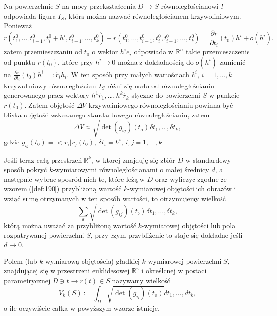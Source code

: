 \documentclass[leqno]{article}
\begin{document}
\begin{justify}
Na powierzchnie $S$ na mocy przekształcenia $D \to S$ równoległościanowi $I$ odpowiada figura $I_S$, która można nazwać równoległościanem krzywoliniowym. Ponieważ 
\[
    r(t_1^0, \ldots, t^0_{i-1}, t^0_i + h^i, t^0_{i + 1}, \ldots, t^0_k) - r(t_1^0, \ldots, t^0_{i-1}, t^0_i, t^0_{i + 1}, \ldots, t^0_k) = \frac{\partial r}{\partial t_i}(t_0)h^i + o(h^i).
\]
zatem przemieszczaniu od $t_0$ o wektor $h^ie_i$ odpowiada w $\mathbb{R}^n$ takie przemieszczenie od punktu $r(t_0)$,
które przy $h^i \to 0$ można z dokładnością do $o(h^i)$ zamienić na $\frac{\partial r}{\partial t_i}(t_0)h^i =: \dot{r_i}h_i$.
W ten sposób przy małych wartościach $h^i$, $i = 1, \ldots, k$ krzywoliniowy równoległościan $I_S$ różni się mało od równoległościaniu generowanego przez wektory 
$h^1\dot{r_1}, \ldots, h^k \dot{r_k}$ styczne do powierzchni $S$ w punkcie $r(t_0)$. Zatem objętość $\Delta V$ krzywoliniowego równoległościaniu powinna być bliska 
objętość wskazanego standardowego równoległościaniu, zatem 
\begin{equation}\label{eq:190}
    \Delta V \approx \sqrt{\det (g_{ij})(t_o)}\delta t_1, \ldots, \delta t_k,
\end{equation}
gdzie $g_{ij}(t_0) = < \dot{r_i} | \dot{r_j}(t_0)$, $\delta t_i = h^i$, $i,j = 1, \ldots, k$. 

Jeśli teraz całą przestrzeń $\mathbb{R}^k$, w której znajduję się zbiór $D$ w standardowy sposób pokryć $k$-wymiarowymi
równoległościanami o małej średnicy $d$, a następnie wybrać sposród nich te, które leżą w $D$ oraz wyliczyć zgodne ze wzorem (\ref{def:190}) przybliżoną wartość 
$k$-wymiarowej objętości ich obrazów i wziąć sumę otrzymanych w ten sposób wartości, to otrzymujemy wielkość
\[
    \sum_{\alpha}\sqrt{\det (g_{ij})(t_o)}\delta t_1, \ldots, \delta t_k,
\]
którą można uważać za przybliżoną wartość $k$-wymiarowej objętości lub pola rozpatrywanej powierzchni $S$, przy czym przybliżenie to staje się dokładne jeśli $d \to 0$.

\begin{defn}
    Polem (lub $k$-wymiarową objętościa) gładkiej $k$-wymiarowej powierzchni $S$, znajdującej się w przestrzeni euklidesowej $\mathbb{R}^n$ i określonej w postaci 
    parametrycznej $D \ni t \to r(t) \in S$ nazywamy wielkość 
    \begin{equation}\label{eq:191}
        V_k(S) := \int_D \sqrt{\det (g_{ij})(t_o)}dt_1, \ldots,  d t_k,
    \end{equation}
    o ile oczywiście całka w powyższym wzorze istnieje.
\end{defn}


\end{justify}
\end{document}
